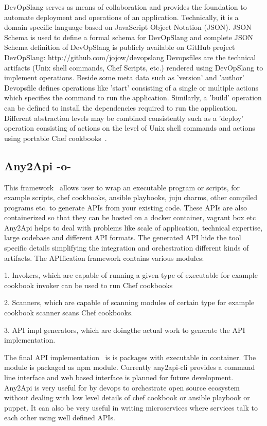 DevOpSlang serves as means of collaboration and provides the
foundation to automate deployment and operations of an
application. Technically, it is a domain specific language based on
JavaScript Object Notation (JSON). JSON Schema is used to define a
formal schema for DevOpSlang and complete JSON Schema definition of
DevOpSlang is publicly available on GitHub project DevOpSlang:
http://github.com/jojow/devopslang Devopsfiles are the technical
artifacts (Unix shell commands, Chef Scripts, etc.)  rendered using
DevOpSlang to implement operations.  Beside some meta data such as
'version' and 'author' Devopsfile defines operations like 'start'
consisting of a single or multiple actions which specifies the command
to run the application. Similarly, a 'build' operation can be defined
to install the dependencies required to run the application. Different
abstraction levels may be combined consistently such as a 'deploy'
operation consisting of actions on the level of Unix shell commands
and actions using portable Chef cookbooks~\cite{DevOpSlang}.

\subsection{Any2Api -o-}

This framework~\cite{wettinger-any2api} allows user to wrap an
executable program or scripts, for example scripts, chef cookbooks,
ansible playbooks, juju charms, other compiled programs etc. to
generate APIs from your existing code.  These APIs are also
containerized so that they can be hosted on a docker container,
vagrant box etc Any2Api helps to deal with problems like scale of
application, technical expertise, large codebase and different API
formats. The generated API hide the tool specific details simplifying
the integration and orchestration different kinds of artifacts. The
APIfication framework contains various modules:

     1. Invokers, which are capable of running a given type of
        executable for example cookbook invoker can be used to run Chef
        cookbooks

     2. Scanners, which are capable of scanning modules of certain type for
        example cookbook scanner scans Chef cookbooks.

     3. API impl generators, which are doingthe actual work to
        generate the API implementation.

        The final API implementation~\cite{www-any2api} is is packages
        with executable in container.  The module is packaged as npm
        module. Currently any2api-cli provides a command line
        interface and web based interface is planned for future
        development. Any2Api is very useful for by devops to
        orchestrate open source ecosystem without dealing with low
        level details of chef cookbook or ansible playbook or
        puppet. It can also be very useful in writing microservices
        where services talk to each other using well defined APIs.

